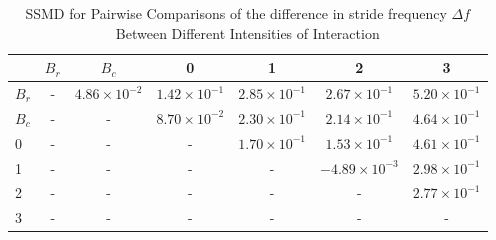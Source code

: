 \begin{table*}[!t]
\caption{SSMD for Pairwise Comparisons of the difference in stride frequency $\Delta f$ Between Different Intensities of Interaction\label{tab:ssmd_delta_f}}
\centering
\begin{tabular}{lcccccc}
\toprule
 & $B_r$ & $B_c$ & 0 & 1 & 2 & 3 \\
\midrule
$B_r$ & - & $4.86 \times 10^{-2}$ & $1.42 \times 10^{-1}$ & $2.85 \times 10^{-1}$ & $2.67 \times 10^{-1}$ & $5.20 \times 10^{-1}$ \\
$B_c$ & - & - & $8.70 \times 10^{-2}$ & $2.30 \times 10^{-1}$ & $2.14 \times 10^{-1}$ & $4.64 \times 10^{-1}$ \\
0 & - & - & - & $1.70 \times 10^{-1}$ & $1.53 \times 10^{-1}$ & $4.61 \times 10^{-1}$ \\
1 & - & - & - & - & $-4.89 \times 10^{-3}$ & $2.98 \times 10^{-1}$ \\
2 & - & - & - & - & - & $2.77 \times 10^{-1}$ \\
3 & - & - & - & - & - & - \\
\bottomrule
\end{tabular}
\end{table*}
